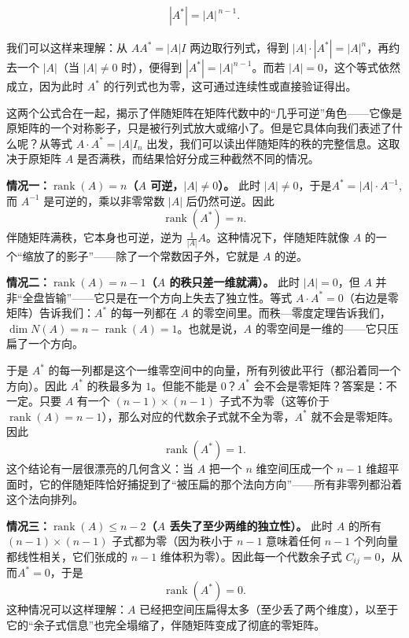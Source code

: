 \documentclass[UTF8]{ctexbook}
\begin{document}
\begin{align*}
|A^*| = |A|^{\,n-1}.
\end{align*}

我们可以这样来理解：从 \(A A^* = |A| I\) 两边取行列式，得到 \(|A| \cdot |A^*| = |A|^n\)，再约去一个 \(|A|\)（当 \(|A| \neq 0\) 时），便得到 \(|A^*| = |A|^{n-1}\)。而若 \(|A| = 0\)，这个等式依然成立，因为此时 \(A^*\) 的行列式也为零，这可通过连续性或直接验证得出。

这两个公式合在一起，揭示了伴随矩阵在矩阵代数中的“几乎可逆”角色——它像是原矩阵的一个对称影子，只是被行列式放大或缩小了。但是它具体向我们表述了什么呢？从等式 $A \cdot A^* = |A| I_n$ 出发，我们可以读出伴随矩阵的秩的完整信息。这取决于原矩阵 $A$ 是否满秩，而结果恰好分成三种截然不同的情况。

\textbf{情况一：$\operatorname{rank}(A) = n$（$A$ 可逆，$|A| \neq 0$）。}
此时 $|A| \neq 0$，于是$A^* = |A| \cdot A^{-1}$,而 $A^{-1}$ 是可逆的，乘以非零常数 $|A|$ 后仍然可逆。因此
\[
\operatorname{rank}(A^*) = n.
\]
伴随矩阵满秩，它本身也可逆，逆为 $\frac{1}{|A|} A$。这种情况下，伴随矩阵就像 $A$ 的一个“缩放了的影子”——除了一个常数因子外，它就是 $A$ 的逆。

\textbf{情况二：$\operatorname{rank}(A) = n-1$（$A$ 的秩只差一维就满）。}
此时 $|A| = 0$，但 $A$ 并非“全盘皆输”——它只是在一个方向上失去了独立性。等式 $A \cdot A^* = 0$（右边是零矩阵）告诉我们：$A^*$ 的每一列都在 $A$ 的零空间里。而秩—零度定理告诉我们，$\dim N(A) = n - \operatorname{rank}(A) = 1$。也就是说，$A$ 的零空间是一维的——它只压扁了一个方向。

于是 $A^*$ 的每一列都是这个一维零空间中的向量，所有列彼此平行（都沿着同一个方向）。因此 $A^*$ 的秩最多为 $1$。但能不能是 $0$？$A^*$ 会不会是零矩阵？答案是：不一定。只要 $A$ 有一个 $(n-1)\times(n-1)$ 子式不为零（这等价于 $\operatorname{rank}(A)=n-1$），那么对应的代数余子式就不全为零，$A^*$ 就不会是零矩阵。因此
\[
\operatorname{rank}(A^*) = 1.
\]
这个结论有一层很漂亮的几何含义：当 $A$ 把一个 $n$ 维空间压成一个 $n-1$ 维超平面时，它的伴随矩阵恰好捕捉到了“被压扁的那个法向方向”——所有非零列都沿着这个法向排列。

\textbf{情况三：$\operatorname{rank}(A) \le n-2$（$A$ 丢失了至少两维的独立性）。}
此时 $A$ 的所有 $(n-1)\times(n-1)$ 子式都为零（因为秩小于 $n-1$ 意味着任何 $n-1$ 个列向量都线性相关，它们张成的 $n-1$ 维体积为零）。因此每一个代数余子式 $C_{ij}=0$，从而$A^* = 0$，于是
\[
\operatorname{rank}(A^*) = 0.
\]
这种情况可以这样理解：$A$ 已经把空间压扁得太多（至少丢了两个维度），以至于它的“余子式信息”也完全塌缩了，伴随矩阵变成了彻底的零矩阵。
\end{document}
